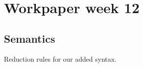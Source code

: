

\author{Group D608F16}
\title{}



\maketitle

\section{Workpaper week 12}

\subsection{Semantics}
Reduction rules for our added syntax.







\grid
\grids
